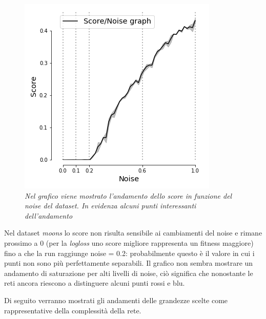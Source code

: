 \documentclass[12pt,a4paper]{report}
\begin{document}
\begin{figure}[H]
 \centering
 \includegraphics[scale = 0.5]{images/score_noise_moons.png}
 \caption{\textit{Nel grafico viene mostrato l'andamento dello score in funzione del noise del dataset. In evidenza alcuni punti interessanti dell'andamento}}
 \label{score_moons}
\end{figure}

Nel dataset \textit{moons} lo score non risulta sensibile ai cambiamenti del noise e rimane prossimo a 0 (per la \textit{logloss} uno score migliore rappresenta un fitness maggiore) fino a che la run raggiunge noise = 0.2: probabilmente questo è il valore in cui i punti non sono più perfettamente separabili.
Il grafico non sembra mostrare un andamento di saturazione per alti livelli di noise, ciò significa che nonostante le reti ancora riescono a distinguere alcuni punti rossi e blu.


Di seguito verranno mostrati gli andamenti delle grandezze scelte come rappresentative della complessità della rete.
\end{document}
